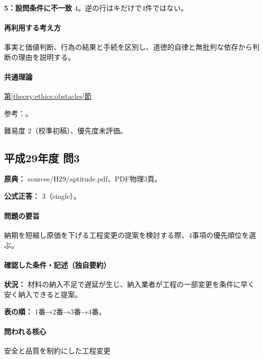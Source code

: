 \noindent\textbf{5：設問条件に不一致} 4。逆の行はキだけで4件ではない。\par

\paragraph{再利用する考え方} 事実と価値判断、行為の結果と手続を区別し、道徳的自律と無批判な依存から判断の理由を説明する。

\paragraph{共通理論} \hyperref[theory:ethics:obstacles]{第\ref*{theory:ethics:obstacles}節}

\par 参考：\cite{davis_seven_steps}。

\par 難易度 2（校準初稿）、優先度未評価。

\subsection{平成29年度 問3}
\label{q:h29-reg-apt-03}

\noindent\textbf{原典：} sources/H29/aptitude.pdf、PDF物理3頁。

\textbf{公式正答：} 3（single）。

\paragraph{問題の要旨} 納期を短縮し原価を下げる工程変更の提案を検討する際、4事項の優先順位を選ぶ。

\paragraph{確認した条件・記述（独自要約）}\mbox{}\par

\noindent\textbf{状況：} 材料の納入不足で遅延が生じ、納入業者が工程の一部変更を条件に早く安く納入できると提案。\par

\noindent\textbf{表の順：} 1番→2番→3番→4番。\par

\paragraph{問われる核心} 安全と品質を制約にした工程変更

